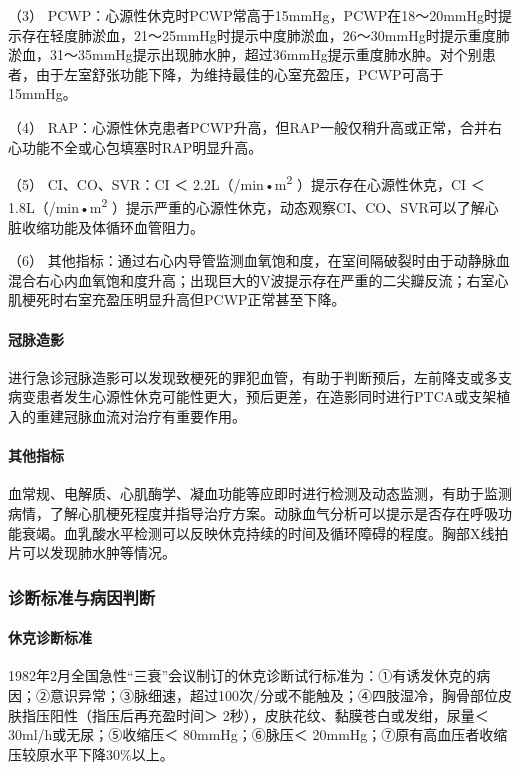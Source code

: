 （3）
PCWP：心源性休克时PCWP常高于15mmHg，PCWP在18～20mmHg时提示存在轻度肺淤血，21～25mmHg时提示中度肺淤血，26～30mmHg时提示重度肺淤血，31～35mmHg提示出现肺水肿，超过36mmHg提示重度肺水肿。对个别患者，由于左室舒张功能下降，为维持最佳的心室充盈压，PCWP可高于15mmHg。

（4）
RAP：心源性休克患者PCWP升高，但RAP一般仅稍升高或正常，合并右心功能不全或心包填塞时RAP明显升高。

（5） CI、CO、SVR：CI ＜ 2.2L（/min•m\textsuperscript{2}
）提示存在心源性休克，CI ＜ 1.8L（/min•m\textsuperscript{2}
）提示严重的心源性休克，动态观察CI、CO、SVR可以了解心脏收缩功能及体循环血管阻力。

（6）
其他指标：通过右心内导管监测血氧饱和度，在室间隔破裂时由于动静脉血混合右心内血氧饱和度升高；出现巨大的V波提示存在严重的二尖瓣反流；右室心肌梗死时右室充盈压明显升高但PCWP正常甚至下降。

\paragraph{冠脉造影}

进行急诊冠脉造影可以发现致梗死的罪犯血管，有助于判断预后，左前降支或多支病变患者发生心源性休克可能性更大，预后更差，在造影同时进行PTCA或支架植入的重建冠脉血流对治疗有重要作用。

\paragraph{其他指标}

血常规、电解质、心肌酶学、凝血功能等应即时进行检测及动态监测，有助于监测病情，了解心肌梗死程度并指导治疗方案。动脉血气分析可以提示是否存在呼吸功能衰竭。血乳酸水平检测可以反映休克持续的时间及循环障碍的程度。胸部X线拍片可以发现肺水肿等情况。

\subsubsection{诊断标准与病因判断}

\paragraph{休克诊断标准}

1982年2月全国急性“三衰”会议制订的休克诊断试行标准为：①有诱发休克的病因；②意识异常；③脉细速，超过100次/分或不能触及；④四肢湿冷，胸骨部位皮肤指压阳性（指压后再充盈时间＞
2秒），皮肤花纹、黏膜苍白或发绀，尿量＜ 30ml/h或无尿；⑤收缩压＜
80mmHg；⑥脉压＜ 20mmHg；⑦原有高血压者收缩压较原水平下降30\%以上。

